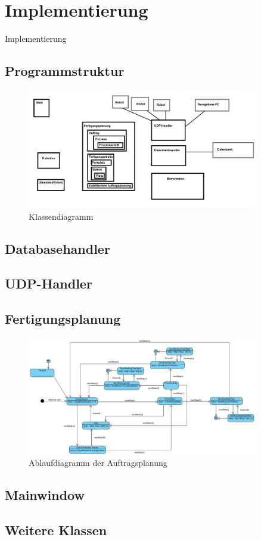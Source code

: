 
\chapter{Implementierung}
\label{sec:Implementierung}

Implementierung

\section{Programmstruktur}

\begin{figure}[htb]
    \centering
    \includegraphics[width=0.9\textwidth]{Abbildungen/Klassendiagramm.PNG}
    \caption{Klassendiagramm}		
    \label{fig:Klassendiagramm}
\end{figure}



\section{Databasehandler}
\section{UDP-Handler} 
\section{Fertigungsplanung}

\begin{figure}[htb]
    \centering
    \includegraphics[width=0.9\textwidth]{Abbildungen/Auftragsplanung.PNG}
    \caption{Ablaufdiagramm der Auftragsplanung}		
    \label{fig:Auftragsplanung}
\end{figure}

\section{Mainwindow}
\section{Weitere Klassen}



